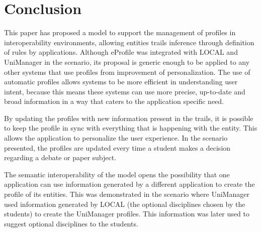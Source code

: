 \documentclass[preprint,authoryear,12pt,dvipdfm]{elsarticle}
\begin{document}


\section{Conclusion}
\label{sec:conclusao}

This paper has proposed a model to support the management of profiles in interoperability environments, allowing entities trails inference through definition of rules by applications. Although eProfile was integrated with LOCAL and UniManager in the scenario, its proposal is generic enough to be applied to any other systems that use profiles from improvement of personalization. The use of automatic profiles allows systems to be more efficient in understanding user intent, because this means these systems can use more precise, up-to-date and broad information in a way that caters to the application specific need.

By updating the profiles with new information present in the trails, it is possible to keep the profile in sync with everything that is happening with the entity. This allows the application to personalize the user experience. In the scenario presented, the profiles are updated every time a student makes a decision regarding a debate or paper subject.

The semantic interoperability of the model opens the possibility that one application can use information generated by a different application to create the profile of its entities. This was demonstrated in the scenario where UniManager used information generated by LOCAL (the optional disciplines chosen by the students) to create the UniManager profiles. This information was later used to suggest optional disciplines to the students.
\end{document}
